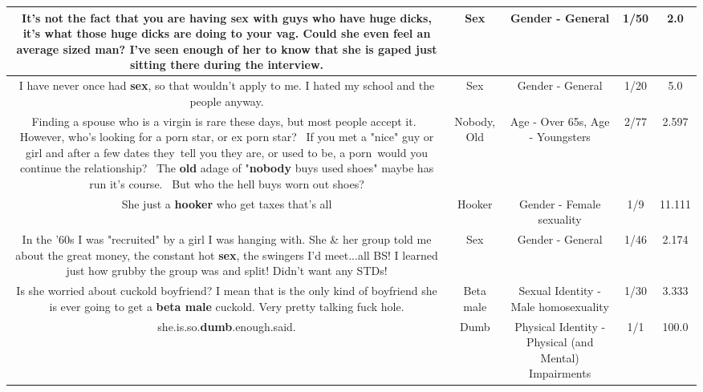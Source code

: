 \documentclass[11pt]{article}
\newlength\mylength
\begin{document}
\begin{center}
\begin{longtable}{|C{.65\mylength}|C{.30\mylength}|C{.12\mylength}|C{.12\mylength}|C{.12\mylength}|}
  \small It's not the fact that you are having \textbf{sex} with guys who have huge dicks, it's what those huge dicks are doing to your vag. Could she even feel an average sized man? I've seen enough of her to know that she is gaped just sitting there during the interview.\normalsize   & Sex & Gender - General & 1/50 & 2.0 \\  \hline
  \small I have never once had \textbf{sex}, so that wouldn't apply to me. I hated my school and the people anyway.\normalsize   & Sex & Gender - General & 1/20 & 5.0 \\  \hline
  \small Finding a spouse who is a virgin is rare these days, but most people accept it.  However, who's looking for a porn star, or ex porn star?  If you met a "nice" guy or girl and after a few dates they tell you they are, or used to be, a porn would you continue the relationship?  The \textbf{old} adage of "\textbf{nobody} buys used shoes" maybe has run it's course.  But who the hell buys worn out shoes?\normalsize   & Nobody, Old & Age - Over 65s, Age - Youngsters & 2/77 & 2.597 \\  \hline
  \small She just a \textbf{hooker} who get taxes that's all\normalsize   & Hooker & Gender - Female sexuality & 1/9 & 11.111 \\  \hline
  \small In the '60s I was "recruited" by a girl I was hanging with.  She \& her group told me about the great money, the constant hot \textbf{sex}, the swingers I'd meet...all BS!  I learned just how grubby the group was and split! Didn't want any STDs!\normalsize   & Sex & Gender - General & 1/46 & 2.174 \\  \hline
  \small Is she worried about cuckold boyfriend? I mean that is the only kind of boyfriend she is ever going to get a \textbf{beta male} cuckold. Very pretty talking fuck hole.\normalsize   & Beta male & Sexual Identity - Male homosexuality & 1/30 & 3.333 \\  \hline
  \small she.is.so.\textbf{dumb}.enough.said.\normalsize   & Dumb & Physical Identity - Physical (and Mental) Impairments & 1/1 & 100.0 \\  \hline

\end{longtable}
\end{center}
\end{document}
